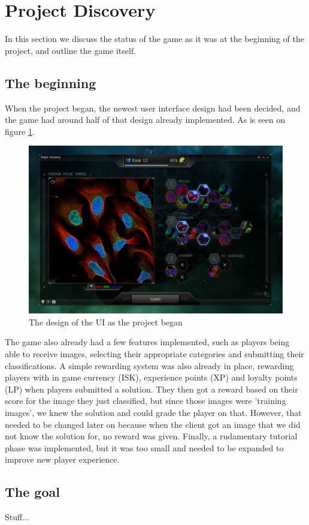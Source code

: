 \section{Project Discovery}\label{sec:project_discovery}
In this section we discuss the status of the game as it was at the beginning of the project, and outline the game itself.\\

\subsection{The beginning}
When the project began, the newest user interface design had been decided, and the game had around half of that design already implemented. As is seen on figure \ref{fig:PD}.

\begin{figure}[H]
	\centering
	\graphicspath{ {./graphics/} }
    \centerline{\includegraphics[scale=0.35]{PD.png}}
    \caption{\label{fig:PD}The design of the UI as the project began}
\end{figure}
\clearpage

The game also already had a few features implemented, such as players being able to receive images, selecting their appropriate categories and submitting their classifications. A simple rewarding system was also already in place, rewarding players with in game currency (ISK), experience points (XP) and loyalty points (LP) when players submitted a solution. They then got a reward based on their score for the image they just classified, but since those images were 'training images', we knew the solution and could grade the player on that. However, that needed to be changed later on because when the client got an image that we did not know the solution for, no reward was given. Finally, a rudamentary tutorial phase was implemented, but it was too small and needed to be expanded to improve new player experience.\\

\subsection{The goal}
Stuff...

